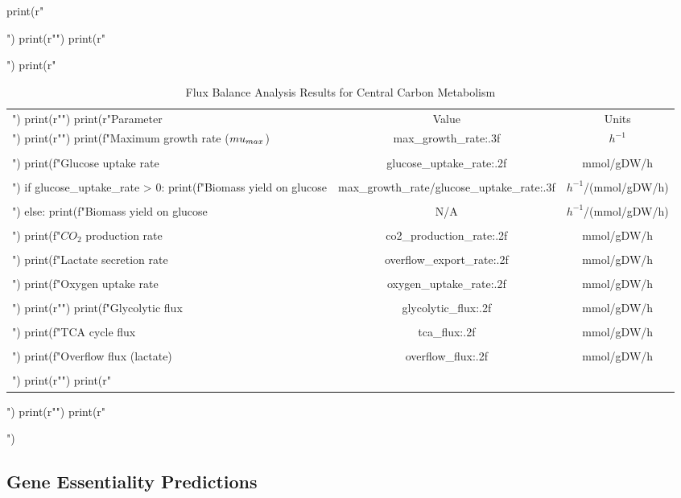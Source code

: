 \documentclass[a4paper, 11pt]{article}
\begin{document}
\begin{pycode}
print(r"\begin{table}[htbp]")
print(r"\centering")
print(r"\caption{Flux Balance Analysis Results for Central Carbon Metabolism}")
print(r"\begin{tabular}{lcc}")
print(r"\toprule")
print(r"Parameter & Value & Units \\")
print(r"\midrule")
print(f"Maximum growth rate ($\\mu_{{max}}$) & {max_growth_rate:.3f} & $h^{{-1}}$ \\\\")
print(f"Glucose uptake rate & {glucose_uptake_rate:.2f} & mmol/gDW/h \\\\")
if glucose_uptake_rate > 0:
    print(f"Biomass yield on glucose & {max_growth_rate/glucose_uptake_rate:.3f} & $h^{{-1}}$/(mmol/gDW/h) \\\\")
else:
    print(f"Biomass yield on glucose & N/A & $h^{{-1}}$/(mmol/gDW/h) \\\\")
print(f"$CO_2$ production rate & {co2_production_rate:.2f} & mmol/gDW/h \\\\")
print(f"Lactate secretion rate & {overflow_export_rate:.2f} & mmol/gDW/h \\\\")
print(f"Oxygen uptake rate & {oxygen_uptake_rate:.2f} & mmol/gDW/h \\\\")
print(r"\midrule")
print(f"Glycolytic flux & {glycolytic_flux:.2f} & mmol/gDW/h \\\\")
print(f"TCA cycle flux & {tca_flux:.2f} & mmol/gDW/h \\\\")
print(f"Overflow flux (lactate) & {overflow_flux:.2f} & mmol/gDW/h \\\\")
print(r"\bottomrule")
print(r"\end{tabular}")
print(r"\label{tab:fba_results}")
print(r"\end{table}")
\end{pycode}

\subsection{Gene Essentiality Predictions}
\end{document}
